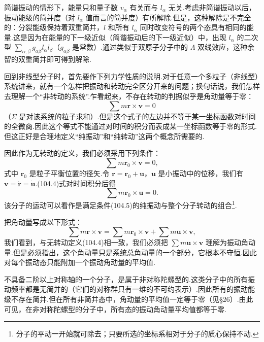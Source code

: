 简谐振动的情形下，能量只和量子数 $v_\alpha$ 有关而与 $l_\alpha$ 无关.考虑非简谐振动以后，振动能级的简并度（对 $l_\alpha$ 值而言的简并度）有所解除.但是，这种解除是不完全的：分裂能级保持着双重简并，$l$ 和所有 $l_\alpha$ 同时改变符号的两个态具有相同的能量.这是因为在能量的下一级近似（简谐振动后的下一级近似）中，出现 $l_\alpha$ 的二次型 $\sum\limits_{\alpha,\beta}g_{\alpha\beta}l_\alpha l_\beta$（$g_{\alpha\beta}$ 是常数）.通过类似于双原子分子中的 $\Lambda$ 双线效应，这种余留的双重简并即可得到解除.

回到非线型分子时，首先要作下列力学性质的说明.对于任意一个多粒子（非线型）系统讲来，就有一个怎样把振动和转动完全区分开来的问题；换句话说，我们怎样去理解一个“非转动的系统”.乍看起来，不存在转动的判据似乎是角动量等于零：
\begin{equation}
  \sum m\boldsymbol{r}\times\boldsymbol{v}=0
\end{equation}
（$\Sigma$ 是对该系统的粒子求和）.但是这个式子的左边并不等于某一坐标函数对时间的全微商.因此这个等式不能通过对时间的积分而表成某一坐标函数等于零的形式.但这正好是合理地定义“纯振动”和“纯转动”这两个概念所需要的.

因此作为无转动的定义，我们必须采用下列条件：
\begin{equation}
  \sum m\boldsymbol{r}_0\times\boldsymbol{v}=0,
\end{equation}
式中 $\boldsymbol{r}_0$ 是粒子平衡位置的径矢.令 $\boldsymbol{r}=\boldsymbol{r}_0+\boldsymbol{u}$，$\boldsymbol{u}$ 是小振动中的位移，我们有 $\boldsymbol{v}=\dot{\boldsymbol{r}}=\dot{\boldsymbol{u}}$.(104.4)式对时间积分后得
\begin{equation}
  \sum m\boldsymbol{r}_0\times\boldsymbol{u}=0.
\end{equation}
该分子的运动可以看作是满足条件(104.5)的纯振动与整个分子转动的组合\footnote{分子的平动一开始就可除去；只要所选的坐标系相对于分子的质心保持不动.}.

把角动量写成以下形式：
\begin{equation*}
  \sum m\boldsymbol{r}\times\boldsymbol{v}
  =\sum m\boldsymbol{r}_0\times\boldsymbol{v}
  +\sum m\boldsymbol{u}\times\boldsymbol{v},
\end{equation*}
我们看到，与无转动定义(104.4)相一致，我们必须把 $\sum m\boldsymbol{u}\times\boldsymbol{v}$ 理解为振动角动量.但是必须指出，这个角动量只是系统总角动量的一个部分，它根本不守恒.因此对每个振动态只能附加一个振动角动量的平均值.

不具备二阶以上对称轴的一个分子，是属于非对称陀螺型的.这类分子中的所有振动频率都是无简并的（它们的对称群只有一维的不可约表示）.因此所有的振动能级不存在简并.但在所有非简并态中，角动量的平均值一定等于零（见§26）.由此可见，在非对称陀螺型的分子中，所有态的振动角动量平均值都等于零.

